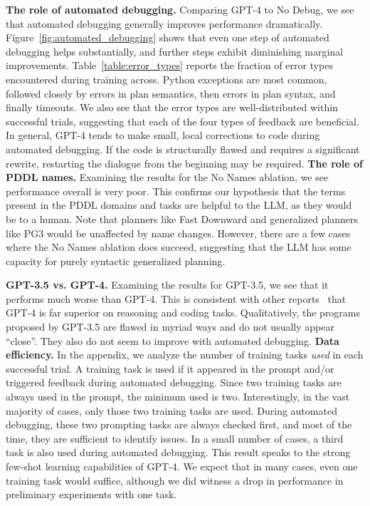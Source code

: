 \documentclass[letterpaper]{article} %
\begin{document}
\textbf{The role of automated debugging.}
Comparing GPT-4 to No Debug, we see that automated debugging generally improves performance dramatically.
Figure~\ref{fig:automated_debugging} shows that even one step of automated debugging helps substantially, and further steps exhibit diminishing marginal improvements.
Table~\ref{table:error_types} reports the fraction of error types encountered during training across.
Python exceptions are most common, followed closely by errors in plan semantics, then errors in plan syntax, and finally timeouts.
We also see that the error types are well-distributed within successful trials, suggesting that each of the four types of feedback are beneficial.
In general, GPT-4 tends to make small, local corrections to code during automated debugging.
If the code is structurally flawed and requires a significant rewrite, restarting the dialogue from the beginning may be required.  \textbf{The role of PDDL names.}
Examining the results for the No Names ablation, we see performance overall is very poor.
This confirms our hypothesis that the terms present in the PDDL domains and tasks are helpful to the LLM, as they would be to a human.
Note that planners like Fast Downward and generalized planners like PG3 would be unaffected by name changes.
However, there are a few cases where the No Names ablation does succeed, suggesting that the LLM has some capacity for purely syntactic generalized planning.

\textbf{GPT-3.5 vs. GPT-4.}
Examining the results for GPT-3.5, we see that it performs much worse than GPT-4.
This is consistent with other reports~\cite{openai2023gpt4,bubeck2023sparks} that GPT-4 is far superior on reasoning and coding tasks.
Qualitatively, the programs proposed by GPT-3.5 are flawed in myriad ways and do not usually appear ``close''.
They also do not seem to improve with automated debugging.  \textbf{Data efficiency.}
In the appendix, we analyze the number of training tasks \emph{used} in each successful trial.
A training task is used if it appeared in the prompt and/or triggered feedback during automated debugging.
Since two training tasks are always used in the prompt, the minimum used is two.
Interestingly, in the vast majority of cases, only those two training tasks are used.
During automated debugging, these two prompting tasks are always checked first, and most of the time, they are sufficient to identify issues.
In a small number of cases, a third task is also used during automated debugging.
This result speaks to the strong few-shot learning capabilities of GPT-4.
We expect that in many cases, even one training task would suffice, although we did witness a drop in performance in preliminary experiments with one task.
\end{document}
